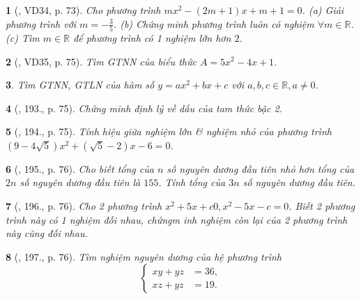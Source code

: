 \documentclass{article}
\newtheorem{baitoan}{}
\begin{document}
\begin{baitoan}[\cite{Tuyen_Toan_9_old}, VD34, p. 73]
	Cho phương trình $mx^2 - (2m + 1)x + m + 1 = 0$. (a) Giải phương trình với $m = -\frac{3}{5}$. (b) Chứng minh phương trình luôn có nghiệm $\forall m\in\mathbb{R}$. (c) Tìm $m\in\mathbb{R}$ để phương trình có 1 nghiệm lớn hơn $2$.
\end{baitoan}

\begin{baitoan}[\cite{Tuyen_Toan_9_old}, VD35, p. 75]
	Tìm {\rm GTNN} của biểu thức $A = 5x^2 - 4x + 1$.
\end{baitoan}

\begin{baitoan}
	Tìm {\rm GTNN, GTLN} của hàm số $y = ax^2 + bx + c$ với $a,b,c\in\mathbb{R},a\ne0$.
\end{baitoan}

\begin{baitoan}[\cite{Tuyen_Toan_9_old}, 193., p. 75]
	Chứng minh định lý về dấu của tam thức bậc 2.
\end{baitoan}

\begin{baitoan}[\cite{Tuyen_Toan_9_old}, 194., p. 75]
	Tính hiệu giữa nghiệm lớn \& nghiệm nhỏ của phương trình $(9 - 4\sqrt{5})x^2 + (\sqrt{5} - 2)x - 6 = 0$.
\end{baitoan}

\begin{baitoan}[\cite{Tuyen_Toan_9_old}, 195., p. 76]
	Cho biết tổng của $n$ số nguyên dương đầu tiên nhỏ hơn tổng của $2n$ số nguyên dương đầu tiên là $155$. Tính tổng của $3n$ số nguyên dương đầu tiên.
\end{baitoan}

\begin{baitoan}[\cite{Tuyen_Toan_9_old}, 196., p. 76]
	Cho 2 phương trình $x^2 + 5x + c 0,x^2 - 5x - c = 0$. Biết 2 phương trình này có 1 nghiệm đối nhau, chứngm inh nghiệm còn lại của 2 phương trình này cũng đối nhau.
\end{baitoan}

\begin{baitoan}[\cite{Tuyen_Toan_9_old}, 197., p. 76]
	Tìm nghiệm nguyên dương của hệ phương trình
	\begin{equation*}
		\left\{\begin{split}
			xy + yz &= 36,\\
			xz + yz &= 19.
		\end{split}\right.
	\end{equation*}
\end{baitoan}
\end{document}
